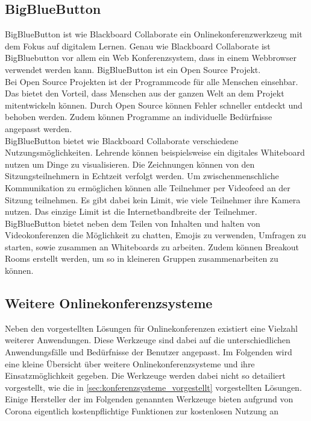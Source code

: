 \subsection{BigBlueButton}
BigBlueButton ist wie Blackboard Collaborate ein Onlinekonferenzwerkzeug mit dem Fokus auf digitalem Lernen.
Genau wie Blackboard Collaborate ist BigBluebutton vor allem ein Web Konferenzsystem, dass in einem Webbrowser verwendet werden kann.
BigBlueButton ist ein Open Source Projekt.
\autocite[Vgl.][]{M_BigBlueButton.o.J.b}
\\
Bei Open Source Projekten ist der Programmcode für alle Menschen einsehbar.
Das bietet den Vorteil, dass Menschen aus der ganzen Welt an dem Projekt mitentwickeln können.
Durch Open Source können Fehler schneller entdeckt und behoben werden.
Zudem können Programme an individuelle Bedürfnisse angepasst werden.
\autocite[Vgl.][]{M_RedHat.o.J.}
\\
BigBlueButton bietet wie Blackboard Collaborate verschiedene Nutzungsmöglichkeiten.
Lehrende können beispielsweise ein digitales Whiteboard nutzen um Dinge zu visualisieren.
Die Zeichnungen können von den Sitzungsteilnehmern in Echtzeit verfolgt werden.
Um zwischenmenschliche Kommunikation zu ermöglichen können alle Teilnehmer per Videofeed an der Sitzung teilnehmen.
Es gibt dabei kein Limit, wie viele Teilnehmer ihre Kamera nutzen. Das einzige Limit ist die Internetbandbreite der Teilnehmer.
\autocite[Vgl.][]{M_BigBlueButton.o.J.}
\\
BigBlueButton bietet neben dem Teilen von Inhalten und halten von Videokonferenzen die Möglichkeit zu chatten, Emojis zu verwenden, Umfragen zu starten, sowie zusammen an Whiteboards zu arbeiten.
Zudem können Breakout Rooms erstellt werden, um so in kleineren Gruppen zusammenarbeiten zu können.
\autocite[Vgl.][]{M_BigBlueButton.o.J.}
\\

\subsection{Weitere Onlinekonferenzsysteme}
Neben den vorgestellten Lösungen für Onlinekonferenzen existiert eine Vielzahl weiterer Anwendungen.
Diese Werkzeuge sind dabei auf die unterschiedlichen Anwendungsfälle und Bedürfnisse der Benutzer angepasst.
Im Folgenden wird eine kleine Übersicht über weitere Onlinekonferenzsysteme und ihre Einsatzmöglichkeit gegeben.
Die Werkzeuge werden dabei nicht so detailiert vorgestellt, wie die in \autoref{sec:konferenzsysteme_vorgestellt} vorgestellten Lösungen.
\\
Einige Hersteller der im Folgenden genannten Werkzeuge bieten aufgrund von Corona eigentlich kostenpflichtige Funktionen zur kostenlosen Nutzung an
\autocite[Vgl.][]{M_Straub.o.J.}

